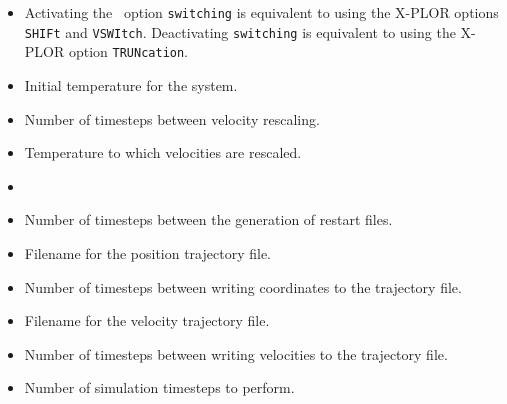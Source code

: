 \begin{itemize}
\item
{}
{Activating the \NAMD\ option \verb!switching! is equivalent 
to using the X-PLOR options \verb!SHIFt! and \verb!VSWItch!.  
Deactivating \verb!switching! is equivalent 
to using the X-PLOR option \verb!TRUNcation!.}

\item
{}
{Initial temperature for the system.}

\item
{}
{Number of timesteps between velocity rescaling.}

\item
{}
{Temperature to which velocities are rescaled.}

\item
{}

\item
{}
{Number of timesteps between the generation of restart files.}

\item
{}
{Filename for the position trajectory file.} 

\item
{}
{Number of timesteps between writing coordinates to the trajectory file.}

\item
{}
{Filename for the velocity trajectory file.}

\item
{}
{Number of timesteps between writing velocities to the trajectory file.} 

\item
{}
{Number of simulation timesteps to perform.}

\end{itemize}


